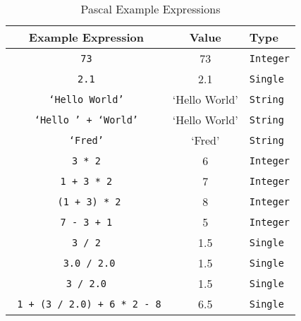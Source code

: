 \begin{table}[h]
  \begin{minipage}{\textwidth}
  \centering
  \begin{tabular}{|c|c|l|}
    \hline
    \textbf{Example Expression} & \textbf{Value} & \textbf{Type} \\
    \hline
    \texttt{ 73 }     &   73                 & \texttt{Integer}  \\
    \texttt{ 2.1 }      & 2.1   & \texttt{Single}    \\
    \texttt{ `Hello World' }      &   `Hello World'    & \texttt{String}   \\
    \texttt{ `Hello ' + `World' }      &   `Hello World'    & \texttt{String}   \\
    \texttt{ `Fred' }      &   `Fred'    & \texttt{String}   \\
    \texttt{ 3 * 2 } & 6 & \texttt{Integer} \\
    \texttt{ 1 + 3 * 2 }  & 7 & \texttt{Integer} \\
    \texttt{ (1 + 3) * 2} & 8 & \texttt{Integer} \\
    \texttt{ 7 - 3 + 1 }  & 5 & \texttt{Integer} \\
    \texttt{ 3 / 2 } & 1.5 & \texttt{Single} \\
    \texttt{ 3.0 / 2.0} & 1.5 & \texttt{Single} \\
    \texttt{ 3 / 2.0 } & 1.5 & \texttt{Single} \\
    \texttt{ 1 + (3 / 2.0) + 6 * 2 - 8} & 6.5 & \texttt{Single} \\
    \hline
  \end{tabular}
\end{minipage}
  \caption{Pascal Example Expressions}
  \label{tbl:program-creation-pas example expresions}
\end{table}




